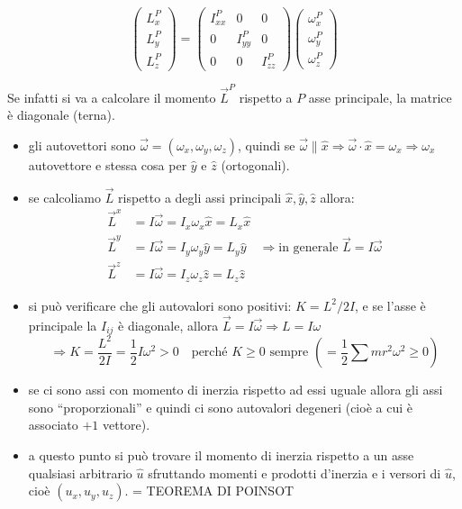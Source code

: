 \begin{minipage}{0.5\textwidth}
\begin{equation}
    \begin{pmatrix}
L_x^P \\ L_y^P \\ L_z^P
\end{pmatrix}
=
\begin{pmatrix}
I_{xx}^P & 0 & 0 \\
0 & I_{yy}^P & 0 \\
0 & 0 & I_{zz}^P
\end{pmatrix}
\begin{pmatrix}
\omega_x^P \\ \omega_y^P \\ \omega_z^P
\end{pmatrix}
\end{equation}
\end{minipage}
\begin{minipage}{0.45\textwidth}
Se infatti si va a calcolare il momento $\vec{L}^P$ rispetto a $P$ asse principale, la matrice è diagonale (terna).
\end{minipage}

\begin{itemize}
    \item gli autovettori sono $\vec{\omega} = (\omega_x, \omega_y, \omega_z)$, quindi se $\vec{\omega} \parallel \hat{x} \Rightarrow \vec{\omega} \cdot \hat{x} = \omega_x \Rightarrow \omega_x$ autovettore e stessa cosa per $\hat{y}$ e $\hat{z}$ (ortogonali).
    \item se calcoliamo $\vec{L}$ rispetto a degli assi principali $\hat{x}, \hat{y}, \hat{z}$ allora:
    \begin{align*}
    \vec{L}^x &= I \vec{\omega} = I_x \omega_x \hat{x} = L_x \hat{x} \\
    \vec{L}^y &= I \vec{\omega} = I_y \omega_y \hat{y} = L_y \hat{y} \quad \Rightarrow \text{in generale } \vec{L} = I \vec{\omega} \\
    \vec{L}^z &= I \vec{\omega} = I_z \omega_z \hat{z} = L_z \hat{z}
    \end{align*}
    \item si può verificare che gli autovalori sono positivi: $K = L^2 / 2I$, e se l'asse è principale la $I_{ij}$ è diagonale, allora $\vec{L} = I \vec{\omega} \Rightarrow L = I \omega$
    \begin{equation}
    \Rightarrow K = \frac{L^2}{2I} = \frac{1}{2} I \omega^2 > 0 \quad \text{perché } K \geq 0 \text{ sempre } \left(= \frac{1}{2} \sum m r^2 \omega^2 \geq 0\right)
\end{equation}
    \item se ci sono assi con momento di inerzia rispetto ad essi uguale allora gli assi sono ``proporzionali'' e quindi ci sono autovalori degeneri (cioè a cui è associato $+1$ vettore).
    \item a questo punto si può trovare il momento di inerzia rispetto a un asse qualsiasi arbitrario $\hat{u}$ sfruttando momenti e prodotti d'inerzia e i versori di $\hat{u}$, cioè $(u_x, u_y, u_z)$. = TEOREMA DI POINSOT
\end{itemize}

